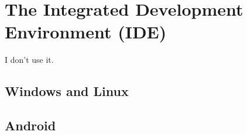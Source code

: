 \chapter{The Integrated Development Environment (IDE) \label{ide}}

I don't use it.

\section{Windows and Linux}

\section{Android \label{ide_android}}

